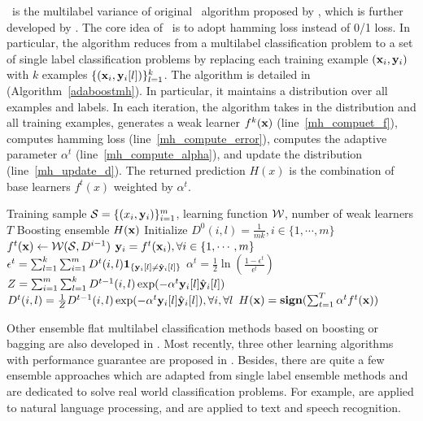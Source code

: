 {\adaboostmh\ is the multilabel variance of original \adaboost\ algorithm proposed by \citet{Schapire99improved}, which is further developed by \citet{Esuli2008boosting}.
The core idea of \adaboostmh\ is to adopt hamming loss instead of 0/1 loss. 
In particular, the algorithm reduces from a multilabel classification problem to a set of single label classification problems by replacing each training example $(\mathbf {x}_i,\mathbf {y}_i)$ with $k$ examples $\{(\mathbf {x}_i,\mathbf {y}_i[l])\}_{l=1}^k$.
The algorithm is detailed in (Algorithm~\ref{adaboostmh}).
In particular, it maintains a distribution over all examples and labels.
In each iteration, the algorithm takes in the distribution and all training examples, generates a weak learner $f^k(\mathbf {x})$ (line~\ref{mh_compuet_f}), computes hamming loss (line~\ref{mh_compute_error}), computes the adaptive parameter $\alpha^t$ (line~\ref{mh_compute_alpha}), and update the distribution (line~\ref{mh_update_d}).
The returned prediction $H(x)$ is the combination of base learners $f^t(x)$ weighted by $\alpha^t$.
\begin{algorithm}
\caption{\adaboostmh}
\label{adaboostmh}
\begin{algorithmic}[1]
	\REQUIRE Training sample $\mathcal{S} = \{(x_i,\mathbf {y}_i)\}_{i=1}^m$, learning function $\mathcal{W}$, number of weak learners $T$
	\ENSURE Boosting ensemble $H(\mathbf {x})$
	\STATE Initialize $D^0(i,l)=\frac{1}{mk},i\in\{1,\cdots,m\}$
		\STATE $f^t(\mathbf {x})\leftarrow\mathcal{W}(\mathcal{S},D^{i-1})$ \label{mh_compuet_f}
		\STATE $\mathbf {y}_i = f^t(\mathbf {x}_i),\forall i\in\{1,\cdots,m\}$
		\STATE $\epsilon^t =\sum_{l=1}^k\sum_{i=1}^{m}D^t(i,l)\mathbf{1}_{\{\mathbf {y}_i[l]\neq\hat{\mathbf {y}}_i[l]\}}$ \label{mh_compute_error}
		\STATE $\alpha^{t} = \frac{1}{2}\ln\left(\frac{1-\epsilon^t}{\epsilon^t}\right)$ \label{mh_compute_alpha}
		\STATE $Z=\sum_{i=1}^{m}\sum_{l=1}^{k}D^{t-1}(i,l)\exp(-\alpha^t\mathbf {y}_i[l]\hat{\mathbf {y}}_i[l])$
		\STATE $D^t(i,l) = \frac{1}{Z}D^{t-1}(i,l)\exp(-\alpha^t\mathbf {y}_i[l]\hat{\mathbf {y}}_i[l]),\forall i,\forall l$ \label{mh_update_d}
	\ENDFOR
	\RETURN $H(\mathbf {x}) = \textbf{sign}(\sum_{t=1}^T\alpha^tf^t(\mathbf {x}))$
\end{algorithmic}
\end{algorithm}

Other ensemble flat multilabel classification methods based on boosting or bagging are also developed in \citep{Wang07simple,Yan07model,Kocev13tree}.
Most recently, three other learning algorithms with performance guarantee are proposed in \citep{Cortes14semble}.
Besides, there are quite a few ensemble approaches which are adapted from single label ensemble methods and are dedicated to solve real world classification problems.
For example, \citep{Collins05distrimnative,Zeman05improving,Sagae06parsing,Zhang09kbest} are applied to natural language processing, and \citep{Fiscus97a,Benesty08speech,Petrov10products}
are applied to text and speech recognition.


}
